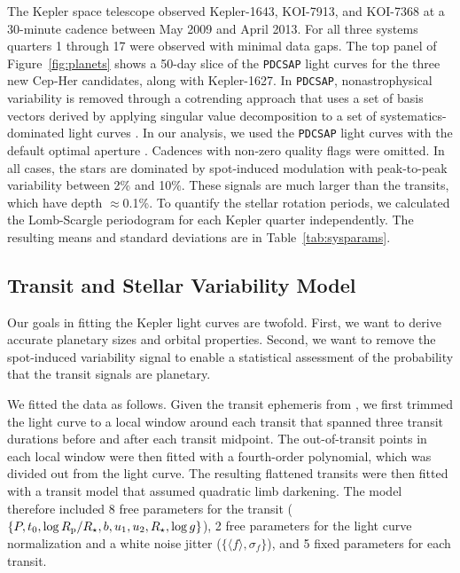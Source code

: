 \documentclass[12pt,twocolumn]{aastex63}
\begin{document}
The Kepler space telescope observed Kepler-1643, KOI-7913, and
KOI-7368 at a 30-minute cadence between May 2009 and April 2013.  For
all three systems quarters 1 through 17 were observed with minimal
data gaps.  The top panel of Figure~\ref{fig:planets} shows a 50-day
slice of the \texttt{PDCSAP} light curves for the three new Cep-Her
candidates, along with Kepler-1627.  In \texttt{PDCSAP},
nonastrophysical variability is removed through a cotrending approach
that uses a set of basis vectors derived by applying singular value
decomposition to a set of systematics-dominated light curves
\citep{smith_kepler_PDC_2017}.  In our analysis, we used the
\texttt{PDCSAP} light curves with the default optimal aperture
\citep{smith_finding_2016}.  Cadences with non-zero quality flags were
omitted.  In all cases, the stars are dominated by spot-induced
modulation with peak-to-peak variability between 2\% and 10\%.  These
signals are much larger than the transits, which have depth
$\approx$0.1\%.  To quantify the stellar rotation periods, we
calculated the Lomb-Scargle periodogram for each Kepler quarter
independently.  The resulting means and standard deviations are in
Table~\ref{tab:sysparams}.


\subsection{Transit and Stellar Variability Model}
\label{sec:fitting}

Our goals in fitting the Kepler light curves are twofold.  First, we
want to derive accurate planetary sizes and orbital properties.
Second, we want to remove the spot-induced variability signal to enable a
statistical assessment of the probability that the transit signals are
planetary.

We fitted the data as follows.  Given the transit
ephemeris from \citet{thompson_planetary_2018}, we first trimmed the
light curve to a local window around each transit that spanned three
transit durations before and after each transit midpoint.  The
out-of-transit points in each local window were then fitted with a
fourth-order polynomial, which was divided out from the light curve.
The resulting flattened transits were then fitted with a transit model
that assumed quadratic limb darkening.  The model therefore included 8
free parameters for the transit ($\{P, t_0, \log R_{\rm p}/R_\star, b,
u_1 ,u_2, R_\star, \log g\}$), 2 free parameters for the light curve
normalization and a white noise jitter ($\{\langle f \rangle, \sigma_f
\}$), and 5 fixed parameters for each transit.
\end{document}
